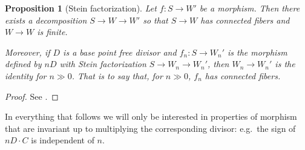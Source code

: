 \documentclass[a4paper,11pt]{amsart}
\newtheorem{proposition}[theorem]{Proposition}
\begin{document}
\begin{proposition}[{Stein factorization}]
	Let $f\colon S \to W'$ be a morphism.
	Then there exists a decomposition $S \to W \to W'$ so that $S\to W$ has connected fibers and $W\to W$ is finite.
	
	Moreover, if $D$ is a base point free divisor and $f_n\colon S \to W_n'$ is the morphism defined by $nD$ with Stein factorization $S \to W_n \to W_n'$, then $W_n \to W_n'$ is the identity for $n \gg 0$.
	That is to say that, for $n \gg 0$, $f_n$ has connected fibers.
\end{proposition}

\begin{proof}
	See \cite[Proposition 1-2-16]{Matsuki}.
\end{proof}

In everything that follows we will only be interested in properties of morphism that are invariant up to multiplying the corresponding divisor:
e.g.\ the sign of $nD\cdot C$ is independent of $n$. 

\begin{center}
\end{center}
\end{document}
